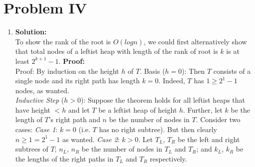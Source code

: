 \section{Problem IV}

\begin{enumerate}[label=(\alph*)]
	\item \textbf{Solution:} \\
	To show the rank of the root is $O(logn)$, we could first alternatively show that total nodes of a leftist heap with length of the rank of root is $k$ is at least $2^{k + 1} - 1$.
	\textbf{Proof:}\\
	Proof: By induction on the height $h$ of $T$.
	Basis ($h=0$): Then $T$ consists of a single node and its right path has length $k=0$. Indeed, $T$ has $1 \geq 2^{1} - 1$ nodes, as wanted.\\
	\textit{Inductive Step} ($h>0$): Suppose the theorem holds for all leftist heaps that have height $< h$
	and let $T$ be a leftist heap of height $h$. Further, let $k$ be the length of $T$’s right path and $n$
	be the number of nodes in $T$. Consider two cases:
	\textit{Case 1}: $k=0$ (i.e. $T$ has no right subtree). But then clearly $n \geq 1 = 2^1 - 1$ as wanted.
	\textit{Case 2}: $k>0$. Let $T_L$, $T_R$ be the left and right subtrees of $T$; $n_L$, $n_R$ be the number of
	nodes in $T_L$ and $T_R$; and $k_L$, $k_R$ be the lengths of the right paths in $T_L$ and $T_R$ respectively.
\end{enumerate}